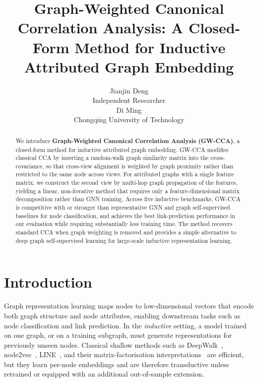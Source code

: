 \documentclass{article}
\title[Graph-Weighted CCA for Inductive Attributed Graph Embedding]
      {Graph-Weighted Canonical Correlation Analysis: A Closed-Form Method for Inductive Attributed Graph Embedding}
\author[J. Deng et al.]{%
Jianjin Deng\\
Independent Researcher\\
\email{jensendengjj@gmail.com}\And
Di Ming\\
Chongqing University of Technology\\
\email{diming@cqut.edu.cn}
}
\begin{document}
\maketitle

\begin{abstract}
We introduce \textbf{Graph-Weighted Canonical Correlation Analysis (GW-CCA)},
a closed-form method for inductive attributed graph embedding. GW-CCA
modifies classical CCA by inserting a random-walk graph similarity matrix
into the cross-covariance, so that cross-view alignment is weighted by
graph proximity rather than restricted to the same node across views. For
attributed graphs with a single feature matrix, we construct the second
view by multi-hop graph propagation of the features, yielding a linear,
non-iterative method that requires only a feature-dimensional
matrix decomposition rather than GNN training. Across five inductive
benchmarks, GW-CCA is competitive with or stronger than representative
GNN and graph self-supervised baselines for node classification, and
achieves the best link-prediction performance in our evaluation while
requiring substantially less training time. The method recovers
standard CCA when graph weighting is removed and provides a simple
alternative to deep graph self-supervised learning for large-scale
inductive representation learning.
\end{abstract}

\section{Introduction}
\label{sec:intro}

Graph representation learning maps nodes to low-dimensional vectors that
encode both graph structure and node attributes, enabling downstream tasks
such as node classification and link prediction. In the \emph{inductive}
setting, a model trained on one graph, or on a training subgraph, must
generate representations for previously unseen nodes. Classical shallow
methods such as DeepWalk~\citep{perozzi2014deepwalk},
node2vec~\citep{grover2016node2vec}, LINE~\citep{tang2015line}, and their
matrix-factorisation interpretations~\citep{qiu2018network} are efficient,
but they learn per-node embeddings and are therefore transductive unless
retrained or equipped with an additional out-of-sample extension.
\end{document}

